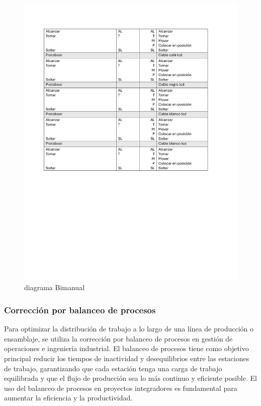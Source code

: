 \begin{figure}[H]
        \centering
        \includegraphics[scale=0.22]{13/img/diagramaBimanualTres.pdf}
        \caption{diagrama Bimanual}
        \label{fig:diagramaBimanual}
    \end{figure}
    \subsubsection{Corrección por balanceo de procesos}
    Para optimizar la distribución de trabajo a lo largo de una línea de producción o ensamblaje, se utiliza la corrección por balanceo de procesos en gestión de operaciones e ingeniería industrial. El balanceo de procesos tiene como objetivo principal reducir los tiempos de inactividad y desequilibrios entre las estaciones de trabajo, garantizando que cada estación tenga una carga de trabajo equilibrada y que el flujo de producción sea lo más continuo y eficiente posible. El uso del balanceo de procesos en proyectos integradores es fundamental para aumentar la eficiencia y la productividad.
